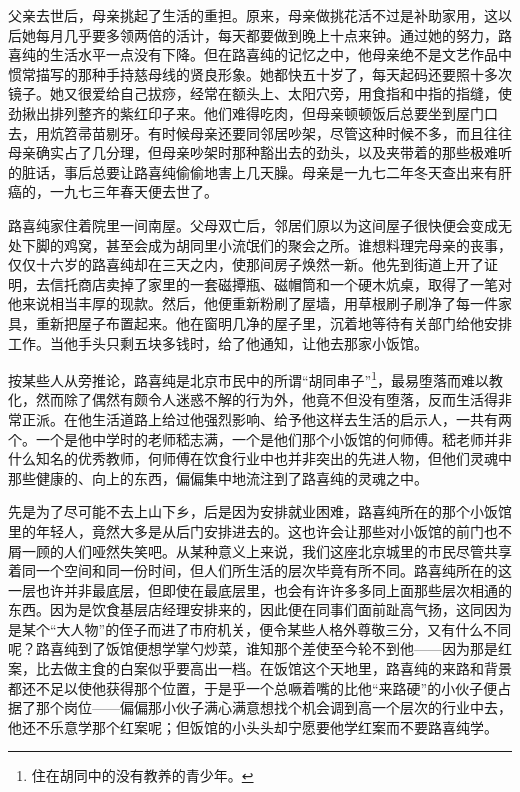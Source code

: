 \par 父亲去世后，母亲挑起了生活的重担。原来，母亲做挑花活不过是补助家用，这以后她每月几乎要多领两倍的活计，每天都要做到晚上十点来钟。通过她的努力，路喜纯的生活水平一点没有下降。但在路喜纯的记忆之中，他母亲绝不是文艺作品中惯常描写的那种手持慈母线的贤良形象。她都快五十岁了，每天起码还要照十多次镜子。她又很爱给自己拔痧，经常在额头上、太阳穴旁，用食指和中指的指缝，使劲揪出排列整齐的紫红印子来。他们难得吃肉，但母亲顿顿饭后总要坐到屋门口去，用炕笤帚苗剔牙。有时候母亲还要同邻居吵架，尽管这种时候不多，而且往往母亲确实占了几分理，但母亲吵架时那种豁出去的劲头，以及夹带着的那些极难听的脏话，事后总要让路喜纯偷偷地害上几天臊。母亲是一九七二年冬天查出来有肝癌的，一九七三年春天便去世了。
\par 路喜纯家住着院里一间南屋。父母双亡后，邻居们原以为这间屋子很快便会变成无处下脚的鸡窝，甚至会成为胡同里小流氓们的聚会之所。谁想料理完母亲的丧事，仅仅十六岁的路喜纯却在三天之内，使那间房子焕然一新。他先到街道上开了证明，去信托商店卖掉了家里的一套磁撢瓶、磁帽筒和一个硬木炕桌，取得了一笔对他来说相当丰厚的现款。然后，他便重新粉刷了屋墙，用草根刷子刷净了每一件家具，重新把屋子布置起来。他在窗明几净的屋子里，沉着地等待有关部门给他安排工作。当他手头只剩五块多钱时，给了他通知，让他去那家小饭馆。
\par 按某些人从旁推论，路喜纯是北京市民中的所谓“胡同串子”\footnote{住在胡同中的没有教养的青少年。}，最易堕落而难以教化，然而除了偶然有颇令人迷惑不解的行为外，他竟不但没有堕落，反而生活得非常正派。在他生活道路上给过他强烈影响、给予他这样去生活的启示人，一共有两个。一个是他中学时的老师嵇志满，一个是他们那个小饭馆的何师傅。嵇老师并非什么知名的优秀教师，何师傅在饮食行业中也并非突出的先进人物，但他们灵魂中那些健康的、向上的东西，偏偏集中地流注到了路喜纯的灵魂之中。
\par 先是为了尽可能不去上山下乡，后是因为安排就业困难，路喜纯所在的那个小饭馆里的年轻人，竟然大多是从后门安排进去的。这也许会让那些对小饭馆的前门也不屑一顾的人们哑然失笑吧。从某种意义上来说，我们这座北京城里的市民尽管共享着同一个空间和同一份时间，但人们所生活的层次毕竟有所不同。路喜纯所在的这一层也许并非最底层，但即使在最底层里，也会有许许多多同上面那些层次相通的东西。因为是饮食基层店经理安排来的，因此便在同事们面前趾高气扬，这同因为是某个“大人物”的侄子而进了市府机关，便令某些人格外尊敬三分，又有什么不同呢？路喜纯到了饭馆便想学掌勺炒菜，谁知那个差使至今轮不到他——因为那是红案，比去做主食的白案似乎要高出一档。在饭馆这个天地里，路喜纯的来路和背景都还不足以使他获得那个位置，于是乎一个总噘着嘴的比他“来路硬”的小伙子便占据了那个岗位——偏偏那小伙子满心满意想找个机会调到高一个层次的行业中去，他还不乐意学那个红案呢；但饭馆的小头头却宁愿要他学红案而不要路喜纯学。
